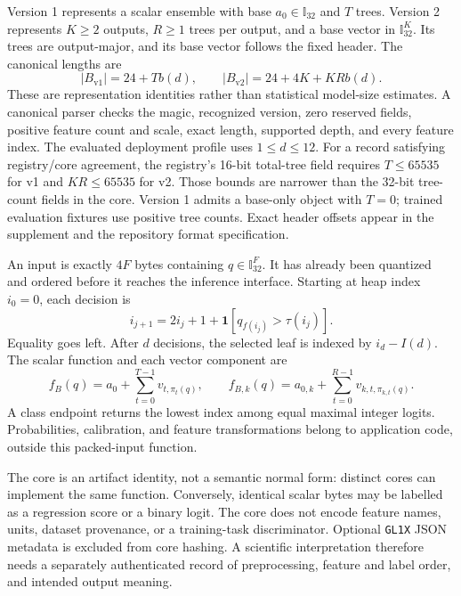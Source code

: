 \documentclass{ledger}
\newcommand{\Ithirtytwo}{\mathbb{I}_{32}}
\newcommand{\codeword}[1]{\texttt{#1}}
\begin{document}
Version 1 represents a scalar ensemble with base $a_0\in\Ithirtytwo$ and $T$
trees. Version 2 represents $K\ge2$ outputs, $R\ge1$ trees per output, and a
base vector in $\Ithirtytwo^K$. Its trees are output-major, and its base
vector follows the fixed header. The canonical lengths are
\begin{equation}
 |B_{\mathrm{v1}}|=24+Tb(d),\qquad
 |B_{\mathrm{v2}}|=24+4K+KRb(d).
 \label{eq:lengths}
\end{equation}
These are representation identities rather than statistical model-size
estimates. A canonical parser checks the magic, recognized version, zero
reserved fields, positive feature count and scale, exact length, supported
depth, and every feature index. The evaluated deployment profile uses
$1\le d\le12$. For a record satisfying registry/core agreement, the registry's 16-bit
total-tree field requires $T\le65535$ for v1 and $KR\le65535$ for v2. Those bounds are narrower than the
32-bit tree-count fields in the core. Version 1 admits a base-only object
with $T=0$; trained evaluation fixtures use positive tree counts. Exact
header offsets appear in the supplement and the repository format
specification.

An input is exactly $4F$ bytes containing $q\in\Ithirtytwo^F$. It has already
been quantized and ordered before it reaches the inference interface. Starting
at heap index $i_0=0$, each decision is
\begin{equation}
 i_{j+1}=2i_j+1+\mathbf 1[q_{f(i_j)}>\tau(i_j)].
 \label{eq:traversal}
\end{equation}
Equality goes left. After $d$ decisions, the selected leaf is indexed by
$i_d-I(d)$. The scalar function and each vector component are
\begin{equation}
 f_B(q)=a_0+\sum_{t=0}^{T-1}v_{t,\pi_t(q)},\qquad
 f_{B,k}(q)=a_{0,k}+\sum_{t=0}^{R-1}v_{k,t,\pi_{k,t}(q)}.
 \label{eq:prediction}
\end{equation}
A class endpoint returns the lowest index among equal maximal integer logits.
Probabilities, calibration, and feature transformations belong to application
code, outside this packed-input function.

The core is an artifact identity, not a semantic normal form: distinct cores
can implement the same function. Conversely, identical scalar bytes may be
labelled as a regression score or a binary logit. The core does not encode
feature names, units, dataset provenance, or a training-task discriminator.
Optional \codeword{GL1X} JSON metadata is excluded from core hashing. A
scientific interpretation therefore needs a separately authenticated record of
preprocessing, feature and label order, and intended output meaning.
\end{document}
